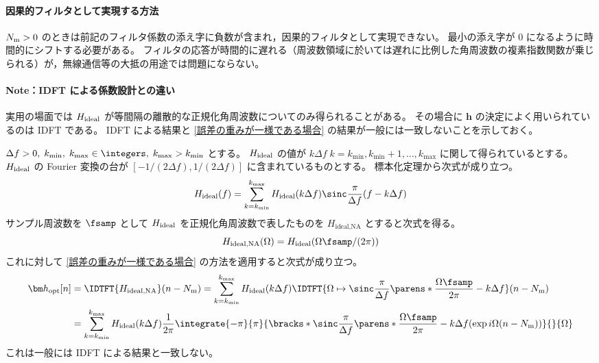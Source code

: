             \paragraph{因果的フィルタとして実現する方法}
                \label{因果的フィルタとして実現する方法}
                ${N_\text{m}}>0$ のときは前記のフィルタ係数の添え字に負数が含まれ，因果的フィルタとして実現できない。
                最小の添え字が 0 になるように時間的にシフトする必要がある。
                フィルタの応答が時間的に遅れる（周波数領域に於いては遅れに比例した角周波数の複素指数関数が乗じられる）が，無線通信等の大抵の用途では問題にならない。
            \paragraph{Note：IDFT による係数設計との違い}
                \newcommand*{\kmin}{{k_\text{min}}}
                \newcommand*{\kmax}{{k_\text{max}}}
                \newcommand*{\HidealNA}{H_\text{ideal,NA}}
                実用の場面では $H_\text{ideal}$ が等間隔の離散的な正規化角周波数についてのみ得られることがある。
                その場合に $\bm{h}$ の決定によく用いられているのは IDFT である。
                IDFT による結果と \ref{誤差の重みが一様である場合} の結果が一般には一致しないことを示しておく。
                \par
                $\Delta f>0,\;\kmin,\;\kmax\in\integers,\;\kmax>\kmin$ とする。
                $H_\text{ideal}$ の値が $k\Delta f\;k=\kmin,\kmin+1,\dots,\kmax$ に関して得られているとする。
                $H_\text{ideal}$ の Fourier 変換の台が $[-1/(2\Delta f),1/(2\Delta f)]$ に含まれているものとする。
                標本化定理から次式が成り立つ。
                \[ \Hideal(f) = \sum_{k=\kmin}^\kmax \Hideal(k\Delta f)\sinc\frac{\pi}{\Delta f}(f-k\Delta f) \]
                サンプル周波数を $\fsamp$ として $H_\text{ideal}$ を正規化角周波数で表したものを $\HidealNA$ とすると次式を得る。
                \[ \HidealNA(\Omega) = \Hideal(\Omega\fsamp/(2\pi)) \]
                これに対して \ref{誤差の重みが一様である場合} の方法を適用すると次式が成り立つ。
                \begin{align*}
                    \vhOpt[n] &= \IDTFT{\HidealNA}(n-\Nm) = \sum_{k=\kmin}^\kmax \Hideal(k\Delta f)\IDTFT{\Omega\mapsto\sinc\frac{\pi}{\Delta f}\parens*{\frac{\Omega\fsamp}{2\pi}-k\Delta f}}(n-\Nm) \\
                    &= \sum_{k=\kmin}^\kmax \Hideal(k\Delta f)\frac{1}{2\pi}\integrate{-\pi}{\pi}{\bracks*{\sinc\frac{\pi}{\Delta f}\parens*{\frac{\Omega\fsamp}{2\pi}-k\Delta f}}(\exp i\Omega(n-\Nm))}{}{\Omega}
                \end{align*}
                これは一般には IDFT による結果と一致しない。
